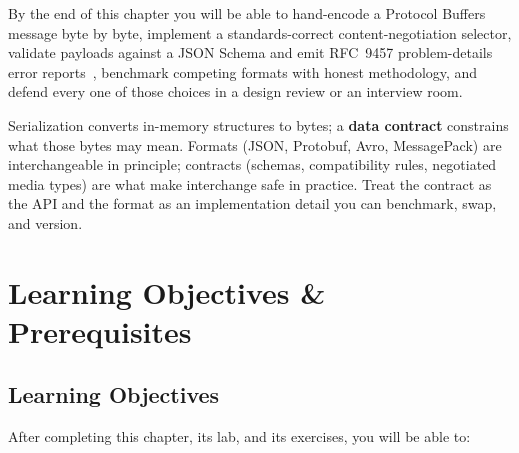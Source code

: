 By the end of this chapter you will be able to hand-encode a Protocol Buffers message
byte by byte, implement a standards-correct content-negotiation selector, validate
payloads against a JSON Schema and emit RFC~9457 problem-details error
reports~\cite{rfc9457}, benchmark competing formats with honest methodology, and defend
every one of those choices in a design review or an interview room.

\begin{keyconceptbox}
Serialization converts in-memory structures to bytes; a \textbf{data contract}
constrains what those bytes may mean. Formats (JSON, Protobuf, Avro, MessagePack) are
interchangeable in principle; contracts (schemas, compatibility rules, negotiated media
types) are what make interchange safe in practice. Treat the contract as the API and
the format as an implementation detail you can benchmark, swap, and version.
\end{keyconceptbox}

\section{Learning Objectives \& Prerequisites}
\label{sec:ch4-objectives}

\subsection*{Learning Objectives}
After completing this chapter, its lab, and its exercises, you will be able to:

